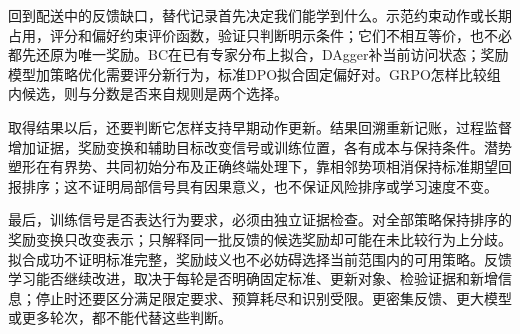 回到配送中的反馈缺口，替代记录首先决定我们能学到什么。示范约束动作或长期占用，评分和偏好约束评价函数，验证只判断明示条件；它们不相互等价，也不必都先还原为唯一奖励。BC在已有专家分布上拟合，DAgger补当前访问状态；奖励模型加策略优化需要评分新行为，标准DPO拟合固定偏好对。GRPO怎样比较组内候选，则与分数是否来自规则是两个选择。

取得结果以后，还要判断它怎样支持早期动作更新。结果回溯重新记账，过程监督增加证据，奖励变换和辅助目标改变信号或训练位置，各有成本与保持条件。潜势塑形在有界势、共同初始分布及正确终端处理下，靠相邻势项相消保持标准期望回报排序；这不证明局部信号具有因果意义，也不保证风险排序或学习速度不变。

最后，训练信号是否表达行为要求，必须由独立证据检查。对全部策略保持排序的奖励变换只改变表示；只解释同一批反馈的候选奖励却可能在未比较行为上分歧。拟合成功不证明标准完整，奖励歧义也不必妨碍选择当前范围内的可用策略。反馈学习能否继续改进，取决于每轮是否明确固定标准、更新对象、检验证据和新增信息；停止时还要区分满足限定要求、预算耗尽和识别受限。更密集反馈、更大模型或更多轮次，都不能代替这些判断。
